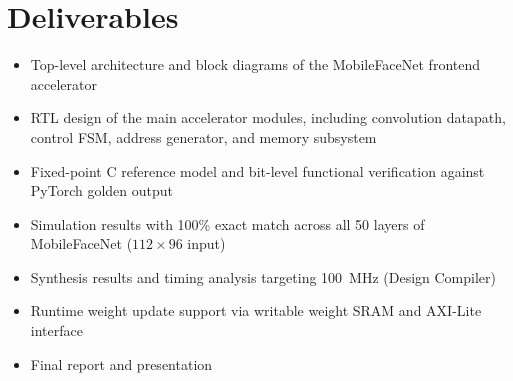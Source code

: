 \section{Deliverables}
 
\begin{itemize}[nosep]
  \item Top-level architecture and block diagrams of the MobileFaceNet frontend accelerator
  \item RTL design of the main accelerator modules, including convolution datapath, control FSM, address generator, and memory subsystem
  \item Fixed-point C reference model and bit-level functional verification against PyTorch golden output
  \item Simulation results with 100\% exact match across all 50 layers of MobileFaceNet ($112\times96$ input)
  \item Synthesis results and timing analysis targeting 100~MHz (Design Compiler)
  \item Runtime weight update support via writable weight SRAM and AXI-Lite interface
  \item Final report and presentation
\end{itemize}
 